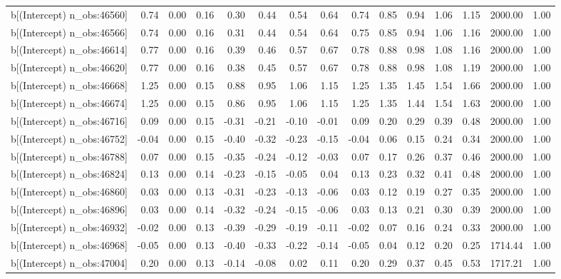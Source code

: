 \begin{table}[ht]
\begin{tabular}{rrrrrrrrrrrrrrr}
  b[(Intercept) n\_obs:46560] & 0.74 & 0.00 & 0.16 & 0.30 & 0.44 & 0.54 & 0.64 & 0.74 & 0.85 & 0.94 & 1.06 & 1.15 & 2000.00 & 1.00 \\ 
  b[(Intercept) n\_obs:46566] & 0.74 & 0.00 & 0.16 & 0.31 & 0.44 & 0.54 & 0.64 & 0.75 & 0.85 & 0.94 & 1.06 & 1.16 & 2000.00 & 1.00 \\ 
  b[(Intercept) n\_obs:46614] & 0.77 & 0.00 & 0.16 & 0.39 & 0.46 & 0.57 & 0.67 & 0.78 & 0.88 & 0.98 & 1.08 & 1.16 & 2000.00 & 1.00 \\ 
  b[(Intercept) n\_obs:46620] & 0.77 & 0.00 & 0.16 & 0.38 & 0.45 & 0.57 & 0.67 & 0.78 & 0.88 & 0.98 & 1.08 & 1.19 & 2000.00 & 1.00 \\ 
  b[(Intercept) n\_obs:46668] & 1.25 & 0.00 & 0.15 & 0.88 & 0.95 & 1.06 & 1.15 & 1.25 & 1.35 & 1.45 & 1.54 & 1.66 & 2000.00 & 1.00 \\ 
  b[(Intercept) n\_obs:46674] & 1.25 & 0.00 & 0.15 & 0.86 & 0.95 & 1.06 & 1.15 & 1.25 & 1.35 & 1.44 & 1.54 & 1.63 & 2000.00 & 1.00 \\ 
  b[(Intercept) n\_obs:46716] & 0.09 & 0.00 & 0.15 & -0.31 & -0.21 & -0.10 & -0.01 & 0.09 & 0.20 & 0.29 & 0.39 & 0.48 & 2000.00 & 1.00 \\ 
  b[(Intercept) n\_obs:46752] & -0.04 & 0.00 & 0.15 & -0.40 & -0.32 & -0.23 & -0.15 & -0.04 & 0.06 & 0.15 & 0.24 & 0.34 & 2000.00 & 1.00 \\ 
  b[(Intercept) n\_obs:46788] & 0.07 & 0.00 & 0.15 & -0.35 & -0.24 & -0.12 & -0.03 & 0.07 & 0.17 & 0.26 & 0.37 & 0.46 & 2000.00 & 1.00 \\ 
  b[(Intercept) n\_obs:46824] & 0.13 & 0.00 & 0.14 & -0.23 & -0.15 & -0.05 & 0.04 & 0.13 & 0.23 & 0.32 & 0.41 & 0.48 & 2000.00 & 1.00 \\ 
  b[(Intercept) n\_obs:46860] & 0.03 & 0.00 & 0.13 & -0.31 & -0.23 & -0.13 & -0.06 & 0.03 & 0.12 & 0.19 & 0.27 & 0.35 & 2000.00 & 1.00 \\ 
  b[(Intercept) n\_obs:46896] & 0.03 & 0.00 & 0.14 & -0.32 & -0.24 & -0.15 & -0.06 & 0.03 & 0.13 & 0.21 & 0.30 & 0.39 & 2000.00 & 1.00 \\ 
  b[(Intercept) n\_obs:46932] & -0.02 & 0.00 & 0.13 & -0.39 & -0.29 & -0.19 & -0.11 & -0.02 & 0.07 & 0.16 & 0.24 & 0.33 & 2000.00 & 1.00 \\ 
  b[(Intercept) n\_obs:46968] & -0.05 & 0.00 & 0.13 & -0.40 & -0.33 & -0.22 & -0.14 & -0.05 & 0.04 & 0.12 & 0.20 & 0.25 & 1714.44 & 1.00 \\ 
  b[(Intercept) n\_obs:47004] & 0.20 & 0.00 & 0.13 & -0.14 & -0.08 & 0.02 & 0.11 & 0.20 & 0.29 & 0.37 & 0.45 & 0.53 & 1717.21 & 1.00 \\ 

\end{tabular}
\end{table}
